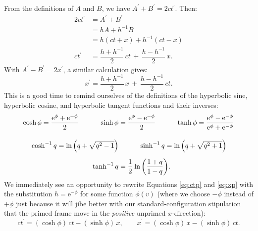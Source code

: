 \documentclass[12pt]{article}
\begin{document}
From the definitions of $A$ and $B$, we have $A^{\prime} + B^{\prime} = 2ct^{\prime}$. Then:
\begin{equation}\label{eq:ctp}
\begin{split}
2 ct^{\prime} &= A^{\prime} + B^{\prime} \\
&= hA + h^{-1}B \\
&= h(ct + x) + h^{-1}(ct - x) \\[1pt]
ct^{\prime} &= \dfrac{h + h^{-1}}{2} \, ct \, + \, \dfrac{h - h^{-1}}{2} \, x.
\end{split}
\end{equation}
With $A^{\prime} - B^{\prime} = 2x^{\prime}$, a similar calculation gives:
\begin{equation}\label{eq:xp}
x^{\prime} = \dfrac{h + h^{-1}}{2} \, x \, + \, \dfrac{h - h^{-1}}{2} \, ct .
\end{equation}
This is a good time to remind ourselves of the definitions of the hyperbolic sine, hyperbolic cosine, and hyperbolic tangent functions and their inverses:
\begin{equation}\label{eq:hf}
\begin{aligned}
\cosh{\phi} = \dfrac{\mathrm{e}^\phi + \mathrm{e}^{-\phi}}{2} \qquad \quad \sinh{\phi} &= \dfrac{\mathrm{e}^\phi - \mathrm{e}^{-\phi}}{2} \qquad \quad \tanh{\phi} = \dfrac{\mathrm{e}^\phi - \mathrm{e}^{-\phi}}{\mathrm{e}^\phi + \mathrm{e}^{-\phi}} \\[10pt]
\cosh^{-1}{q} = \ln{ \left( q + \sqrt{q^2 - 1} \right)} &\qquad \quad \sinh^{-1}{q} = \ln{ \left( q + \sqrt{q^2 + 1} \right)} \\[5pt]
\tanh^{-1}{q} &= \dfrac{1}{2} \mkern1mu \ln{ \left( \dfrac{1 + q}{1 - q} \right) } .
\end{aligned}
\end{equation}
We immediately see an opportunity to rewrite Equations \ref{eq:ctp} and \ref{eq:xp} with the substitution $h = \mathrm{e}^{- \phi}$ for some function $\phi (v)$ (where we choose $- \phi$ instead of $+ \phi$ just because it will jibe better with our standard-configuration stipulation that the primed frame move in the \emph{positive} unprimed $x$-direction):
\begin{equation*}
ct^{\prime} = ( \cosh \phi ) \, ct - ( \sinh \phi ) \, x , \qquad x^{\prime} = ( \cosh \phi ) \, x - ( \sinh \phi ) \, ct .
\end{equation*}
\end{document}

